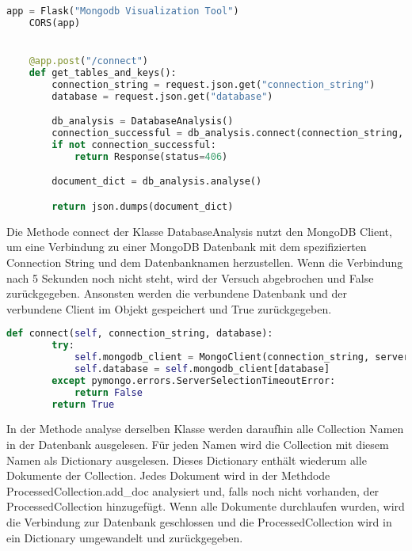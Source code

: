 \begin{lstlisting}[language=python, caption={app.py},label={lst:backend_app}]
    app = Flask("Mongodb Visualization Tool")
    CORS(app)


    @app.post("/connect")
    def get_tables_and_keys():
        connection_string = request.json.get("connection_string")
        database = request.json.get("database")

        db_analysis = DatabaseAnalysis()
        connection_successful = db_analysis.connect(connection_string, database)
        if not connection_successful:
            return Response(status=406)

        document_dict = db_analysis.analyse()

        return json.dumps(document_dict)
\end{lstlisting}

Die Methode connect der Klasse DatabaseAnalysis nutzt  den MongoDB Client, um eine Verbindung zu einer MongoDB Datenbank mit dem spezifizierten Connection String und dem Datenbanknamen herzustellen.
Wenn die Verbindung nach 5 Sekunden noch nicht steht, wird der Versuch abgebrochen und False zurückgegeben.
Ansonsten werden die verbundene Datenbank und der verbundene Client im Objekt gespeichert und True zurückgegeben.

\begin{lstlisting}[language=python, caption={DatabaseAnalysis.connect},label={lst:backend_connect}]
    def connect(self, connection_string, database):
        try:
            self.mongodb_client = MongoClient(connection_string, serverSelectionTimeoutMS=5000)
            self.database = self.mongodb_client[database]
        except pymongo.errors.ServerSelectionTimeoutError:
            return False
        return True
\end{lstlisting}

In der Methode analyse derselben Klasse werden daraufhin alle Collection Namen in der Datenbank ausgelesen.
Für jeden Namen wird die Collection mit diesem Namen als Dictionary ausgelesen.
Dieses Dictionary enthält wiederum alle Dokumente der Collection.
Jedes Dokument wird in der Methdode ProcessedCollection.add\_doc analysiert und, falls noch nicht vorhanden, der ProcessedCollection hinzugefügt.
Wenn alle Dokumente durchlaufen wurden, wird die Verbindung zur Datenbank geschlossen und die ProcessedCollection wird in ein Dictionary umgewandelt und zurückgegeben.

